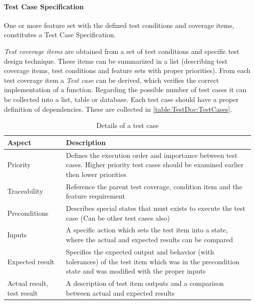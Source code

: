 \paragraph{Test Case Specification}
One or more feature set with the defined test conditions and coverage items, constitutes a Test Case Specification.

\textit{Test coverage items} are obtained from a set of test conditions and specific test design technique. These items can be summarized in a list (describing test coverage items, test conditions and feature sets with proper priorities). From each test coverage item a \textit{Test case} can be derived, which verifies the correct implementation of a function. Regarding the possible number of test cases it can be collected into a list, table or database. Each test case should have a proper definition of dependencies. These are collected in \autoref{table:TestDoc:TestCases}.

\begin{table}[h]
	\caption{Details of a test case}
	\label{table:TestDoc:TestCases}
	\begin{center}
		\renewcommand{\arraystretch}{1.8}
		\begin{tabu} 
			to 0.9 \textwidth
			{  X[0.3, c]  X[c] }
			\toprule
			Aspect                     & Description                                                                                                                                               \\ \midrule
			Priority                   & Defines the execution order and importance between test cases. Higher priority test cases should be examined earlier then lower priorities                \\
			Traceability               & Reference the parent test coverage, condition item and the feature requirement                                                                            \\
			Preconditions              & Describes special states that must exists to execute the test case (Can be other test cases also)                                                         \\
			Inputs                     & A specific action which sets the test item into a state, where the actual and expected results can be compared                                            \\
			Expected result            & Specifies the expected output and behavior (with tolerances) of the test item which was in the precondition state and was modified with the proper inputs \\
			Actual result, test result & A description of test item outputs and a comparison between actual and expected results                                                                   \\ \bottomrule
		\end{tabu}
	\end{center}
\end{table} 

